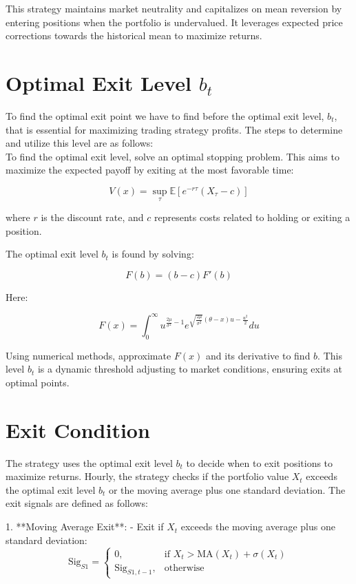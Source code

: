 \documentclass{article}
\begin{document}
This strategy maintains market neutrality and capitalizes on mean reversion by entering positions when the portfolio is undervalued. It leverages expected price corrections towards the historical mean to maximize returns.

\section*{Optimal Exit Level $b_t$}
To find the optimal exit point we have to find before the optimal exit level, \( b_t \), that is essential for maximizing trading strategy profits. The steps to determine and utilize this level are as follows:\\

To find the optimal exit level, solve an optimal stopping problem. This aims to maximize the expected payoff by exiting at the most favorable time:

\[
V(x) = \sup_{\tau} \mathbb{E} \left[ e^{-r \tau} (X_{\tau} - c) \right]
\]

where \( r \) is the discount rate, and \( c \) represents costs related to holding or exiting a position.

The optimal exit level \( b_t \) is found by solving:

\[
F(b) = (b - c) F'(b)
\]

Here:

\[
F(x) = \int_0^\infty u^{\frac{2\mu}{\sigma^2} - 1} e^{\sqrt{\frac{2\mu}{\sigma^2}} (\theta - x) u - \frac{u^2}{2}} du
\]

Using numerical methods, approximate \( F(x) \) and its derivative to find \( b \). This level \( b_t \) is a dynamic threshold adjusting to market conditions, ensuring exits at optimal points.

\section*{Exit Condition}

The strategy uses the optimal exit level \( b_t \) to decide when to exit positions to maximize returns. Hourly, the strategy checks if the portfolio value \( X_t \) exceeds the optimal exit level \( b_t \) or the moving average plus one standard deviation. The exit signals are defined as follows:



1. **Moving Average Exit**:
    - Exit if \( X_t \) exceeds the moving average plus one standard deviation:
    \[
    \text{Sig}_{S1} = 
    \begin{cases} 
    0, & \text{if } X_t > \text{MA}(X_t) + \sigma(X_t) \\
    \text{Sig}_{S1, t-1}, & \text{otherwise}
    \end{cases}
    \]
\end{document}
